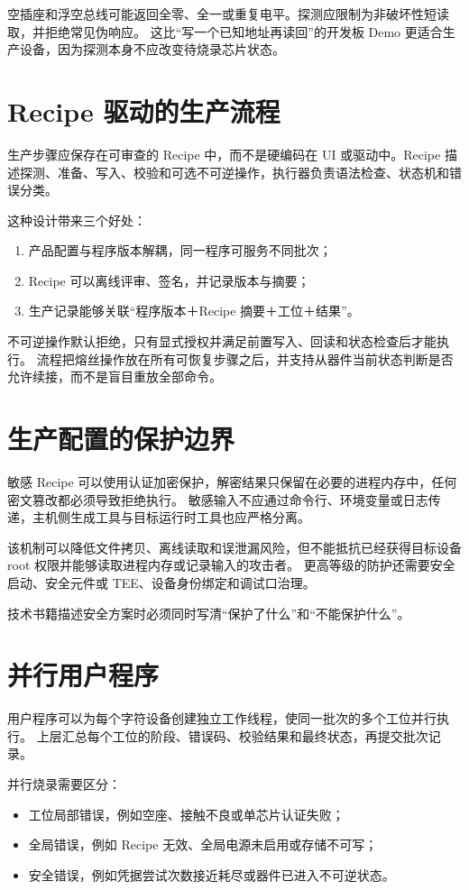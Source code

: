 空插座和浮空总线可能返回全零、全一或重复电平。探测应限制为非破坏性短读取，并拒绝常见伪响应。
这比“写一个已知地址再读回”的开发板 Demo 更适合生产设备，因为探测本身不应改变待烧录芯片状态。

\section{Recipe 驱动的生产流程}

生产步骤应保存在可审查的 Recipe 中，而不是硬编码在 UI 或驱动中。Recipe 描述探测、准备、写入、校验和可选不可逆操作，执行器负责语法检查、状态机和错误分类。

这种设计带来三个好处：
\begin{enumerate}
  \item 产品配置与程序版本解耦，同一程序可服务不同批次；
  \item Recipe 可以离线评审、签名，并记录版本与摘要；
  \item 生产记录能够关联“程序版本＋Recipe 摘要＋工位＋结果”。
\end{enumerate}

不可逆操作默认拒绝，只有显式授权并满足前置写入、回读和状态检查后才能执行。
流程把熔丝操作放在所有可恢复步骤之后，并支持从器件当前状态判断是否允许续接，而不是盲目重放全部命令。

\section{生产配置的保护边界}

敏感 Recipe 可以使用认证加密保护，解密结果只保留在必要的进程内存中，任何密文篡改都必须导致拒绝执行。
敏感输入不应通过命令行、环境变量或日志传递，主机侧生成工具与目标运行时工具也应严格分离。

该机制可以降低文件拷贝、离线读取和误泄漏风险，但不能抵抗已经获得目标设备 root 权限并能够读取进程内存或记录输入的攻击者。
更高等级的防护还需要安全启动、安全元件或 TEE、设备身份绑定和调试口治理。

技术书籍描述安全方案时必须同时写清“保护了什么”和“不能保护什么”。

\section{并行用户程序}

用户程序可以为每个字符设备创建独立工作线程，使同一批次的多个工位并行执行。
上层汇总每个工位的阶段、错误码、校验结果和最终状态，再提交批次记录。

并行烧录需要区分：
\begin{itemize}
  \item 工位局部错误，例如空座、接触不良或单芯片认证失败；
  \item 全局错误，例如 Recipe 无效、全局电源未启用或存储不可写；
  \item 安全错误，例如凭据尝试次数接近耗尽或器件已进入不可逆状态。
\end{itemize}

